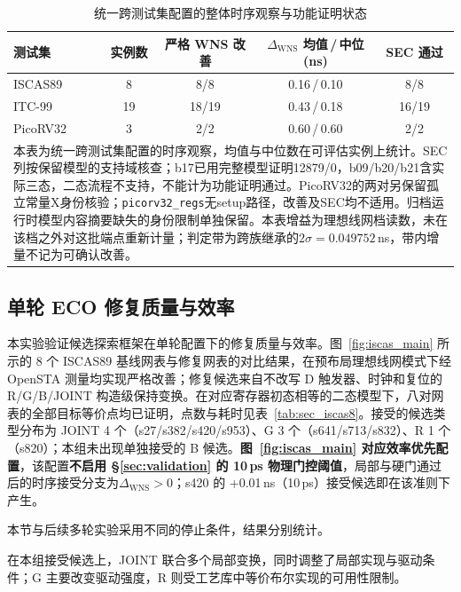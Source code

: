 \documentclass[twocolumn,10pt,fontset=windows]{ctexart}
\begin{document}
\begin{table}[!htb]
\centering
\caption{统一跨测试集配置的整体时序观察与功能证明状态}
\label{tab:overview}
\scriptsize
\setlength{\tabcolsep}{3pt}
\begin{tabular}{lcccc}
\toprule
\textbf{测试集} & \textbf{实例数} & \textbf{严格 WNS 改善} & \textbf{$\Delta_{\mathrm{WNS}}$ 均值\,/\,中位 (ns)} & \textbf{SEC 通过} \\
\midrule
ISCAS89  & 8  & 8/8   & 0.16\,/\,0.10 & 8/8 \\
ITC-99   & 19 & 18/19 & 0.43\,/\,0.18 & 16/19 \\
PicoRV32 & 3  & 2/2   & 0.60\,/\,0.60 & 2/2 \\
\bottomrule
\multicolumn{5}{p{0.95\columnwidth}}{\footnotesize 本表为统一跨测试集配置的时序观察，均值与中位数在可评估实例上统计。SEC列按保留模型的支持域核查；b17已用完整模型证明12879/0，b09/b20/b21含实际三态，二态流程不支持，不能计为功能证明通过。PicoRV32的两对另保留孤立常量X身份核验；\texttt{picorv32\_regs}无setup路径，改善及SEC均不适用。归档运行时模型内容摘要缺失的身份限制单独保留。本表增益为理想线网档读数，未在该档之外对这批端点重新计量；判定带为跨族继承的$2\sigma=0.049752$\,ns，带内增量不记为可确认改善。} \\
\end{tabular}
\end{table}
\subsection{单轮 ECO 修复质量与效率}\label{sec:iscas}

本实验验证候选探索框架在单轮配置下的修复质量与效率。图~\ref{fig:iscas_main} 所示的 8 个 ISCAS89 基线网表与修复网表的对比结果，在预布局理想线网模式下经 OpenSTA 测量均实现严格改善；修复候选来自不改写 D 触发器、时钟和复位的 R/G/B/JOINT 构造级保持变换。在对应寄存器初态相等的二态模型下，八对网表的全部目标等价点均已证明，点数与耗时见表~\ref{tab:sec_iscas8}。接受的候选类型分布为 JOINT 4 个（s27/s382/s420/s953）、G 3 个（s641/s713/s832）、R 1 个（s820）；本组未出现单独接受的 B 候选。\textbf{图~\ref{fig:iscas_main} 对应效率优先配置}\label{sec:eff_prio}，该配置\textbf{不启用 \S\ref{sec:validation} 的 10\,ps 物理门控阈值}，局部与硬门通过后的时序接受分支为$\Delta_{\mathrm{WNS}}>0$；s420 的 +0.01\,ns（10\,ps）接受候选即在该准则下产生。

本节与后续多轮实验采用不同的停止条件，结果分别统计。

在本组接受候选上，JOINT 联合多个局部变换，同时调整了局部实现与驱动条件；G 主要改变驱动强度，R 则受工艺库中等价布尔实现的可用性限制。
\end{document}
